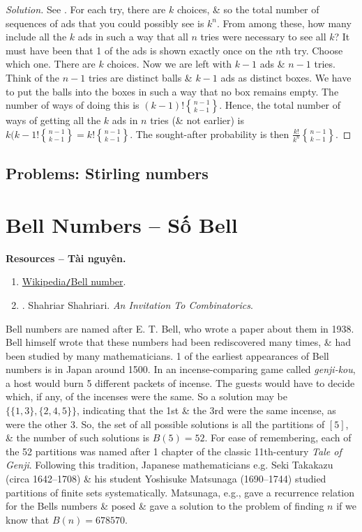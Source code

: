 \documentclass[oneside]{book}
\newcommand{\genstirlingII}[3]{%
	\genfrac{\{}{\}}{0pt}{#1}{#2}{#3}%
}
\newcommand{\stirlingII}[2]{\genstirlingII{}{#1}{#2}}
\begin{document}
\begin{proof}[Solution]
	See \cite[p. 199]{Shahriari2022}. For each try, there are $k$ choices, \& so the total number of sequences of ads that you could possibly see is $k^n$. From among these, how many include all the $k$ ads in such a way that all $n$ tries were necessary to see all $k$? It must have been that 1 of the ads is shown exactly once on the $n$th try. Choose which one. There are $k$ choices. Now we are left with $k - 1$ ads \& $n - 1$ tries. Think of the $n - 1$ tries are distinct balls \& $k - 1$ ads as distinct boxes. We have to put the balls into the boxes in such a way that no box remains empty. The number of ways of doing this is $(k - 1)!\stirlingII{n - 1}{k - 1}$. Hence, the total number of ways of getting all the $k$ ads in $n$ tries (\& not earlier) is $k(k - 1!\stirlingII{n - 1}{k - 1} = k!\stirlingII{n - 1}{k - 1}$. The sought-after probability is then $\frac{k!}{k^n}\stirlingII{n - 1}{k - 1}$.
\end{proof}


\subsection{Problems: Stirling numbers}


\section{Bell Numbers -- Số Bell}
\textbf{\textsf{Resources -- Tài nguyên.}}
\begin{enumerate}
	\item \href{https://en.wikipedia.org/wiki/Bell_number}{Wikipedia{\tt/}Bell number}.
	\item \cite{Shahriari2022}. {\sc Shahriar Shahriari}. {\it An Invitation To Combinatorics}.
\end{enumerate}
Bell numbers are named after {\sc E. T. Bell}, who wrote a paper about them in 1938. {\sc Bell} himself wrote that these numbers had been rediscovered many times, \& had been studied by many mathematicians. 1 of the earliest appearances of Bell numbers is in Japan around 1500. In an incense-comparing game called {\it genji-kou}, a host would burn 5 different packets of incense. The guests would have to decide which, if any, of the incenses were the same. So a solution may be $\{\{1,3\},\{2,4,5\}\}$, indicating that the 1st \& the 3rd were the same incense, as were the other 3. So, the set of all possible solutions is all the partitions of $[5]$, \& the number of such solutions is $B(5) = 52$. For ease of remembering, each of the 52 partitions was named after 1 chapter of the classic 11th-century {\it Tale of Genji}. Following this tradition, Japanese mathematicians e.g. {\sc Seki Takakazu} (circa 1642--1708) \& his student {\sc Yoshisuke Matsunaga} (1690--1744) studied partitions of finite sets systematically. {\sc Matsunaga}, e.g., gave a recurrence relation for the Bells numbers \& posed \& gave a solution to the problem of finding $n$ if we know that $B(n) = 678570$.
\end{document}
